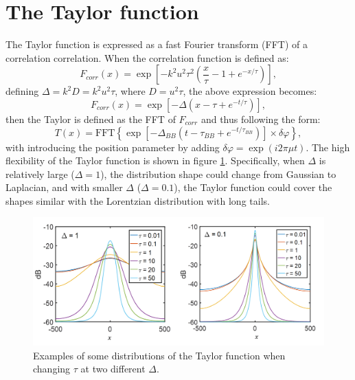 \section*{The Taylor function}


The Taylor function is expressed as a fast Fourier transform (FFT) of a correlation correlation. When the correlation function is defined as:%
\begin{equation}
  F_{corr}(x) = \exp\left[-k^2u^2\tau^2\left(\frac{x}{\tau}-1+e^{-x/\tau}\right)\right],
  \label{eq:Fcorr}
\end{equation}
\noindent defining $\Delta = k^2D = k^2u^2\tau$, where $D = u^2\tau$, the above expression becomes:%
\begin{equation}
  F_{corr}(x) = \exp\left[-\Delta(x-\tau+e^{-t/\tau})\right],
  \label{eq:Fcorr}
\end{equation}
\noindent then the Taylor is defined as the FFT of $F_{corr}$ and thus following the form:%
\begin{equation}\label{eq:BBT}
  T(x) = \mathrm{FFT}\left\{\exp\left[-\Delta_{BB}(t-\tau_{BB}+e^{-t/\tau_{BB}})\right]\times\delta\varphi\right\},
\end{equation}
\noindent with introducing the position parameter by adding $\delta\varphi = \exp(i2\pi\mu t)$. The high flexibility of the Taylor function is shown in figure \ref{fig:TD_plot}. Specifically, when $\Delta$ is relatively large ($\Delta = 1$), the distribution shape could change from Gaussian to Laplacian, and with smaller $\Delta$ ($\Delta = 0.1$), the Taylor function could cover the shapes similar with the Lorentzian distribution with long tails. 


\begin{figure}[h]
\begin{centering}
\includegraphics[scale=0.5]{fig_TD_plot.png}
\par\end{centering}
\caption{Examples of some distributions of the Taylor function when changing $\tau$ at two different $\Delta$.}
\label{fig:TD_plot}
\end{figure}




